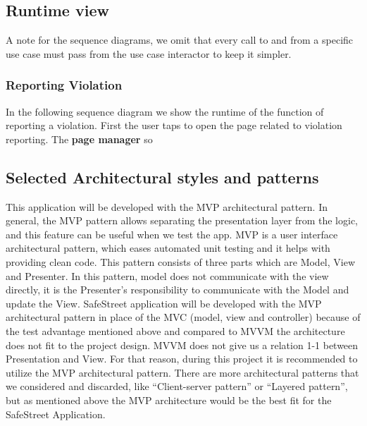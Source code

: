 \subsection{Runtime view}


A note for the sequence diagrams, we omit that every call to and from a specific use case must pass from the use case interactor to keep it simpler.

\subsubsection{Reporting Violation}

In the following sequence diagram we show the runtime of the function of reporting a violation.
First the user taps to open the page related to violation reporting. The \textbf{page manager} so







\subsection{Selected Architectural styles and patterns}


 \label{cleanArchiref}

This application will be developed with the MVP architectural pattern. In general, the MVP pattern allows separating the presentation layer from the logic, and this feature can be useful when we test the app. MVP is a user interface architectural pattern, which eases automated unit testing and it helps with providing clean code. This pattern consists of three parts which are Model, View and Presenter. In this pattern, model does not communicate with the view directly, it is the Presenter’s responsibility to communicate with the Model and update the View. SafeStreet application will be developed with the MVP architectural pattern in place of the MVC (model, view and controller) because of the test advantage mentioned above and compared to MVVM the architecture does not ﬁt to the project design. MVVM does not give us a relation 1-1 between Presentation and View. For that reason, during this project it is recommended to utilize the MVP architectural pattern. There are more architectural patterns that we considered and discarded, like “Client-server pattern” or “Layered pattern”, but as mentioned above the MVP architecture would be the best ﬁt for the SafeStreet Application.

